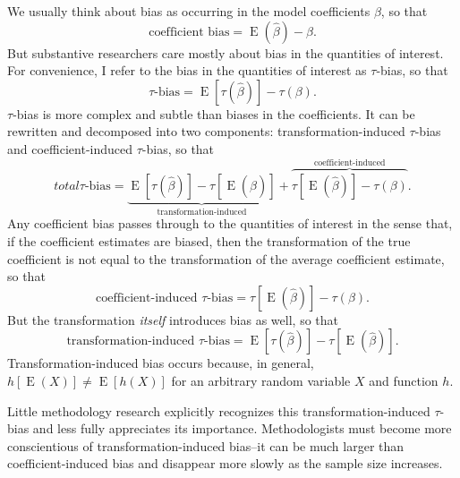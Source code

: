 \documentclass[12pt]{article}
\DeclareMathOperator*{\E}{\text{E}}
\begin{document}
We usually think about bias as occurring in the model coefficients $\beta$, so that 
\begin{equation}
\text{coefficient bias} = \E(\hat{\beta}) - \beta \text{.}  \nonumber
\end{equation}
But substantive researchers care mostly about bias in the quantities of interest. For convenience, I refer to the bias in the quantities of interest as $\tau$-bias, so that
\begin{equation}
\tau\text{-bias} = \E[\tau(\hat{\beta})] - \tau(\beta)\text{.} \nonumber
\end{equation}
$\tau$-bias is more complex and subtle than biases in the coefficients. 
It can be rewritten and decomposed into two components: transformation-induced $\tau$-bias and coefficient-induced $\tau$-bias, so that
\begin{equation}
total \tau\text{-bias}= \underbrace{ \E[\tau(\hat{\beta})]-  \tau[\E(\hat{\beta})]  }_{\text{transformation-induced}} + \overbrace{  \tau[\E(\hat{\beta})] - \tau(\beta)  }^{\text{coefficient-induced}}\text{.} \nonumber
\end{equation}
Any coefficient bias passes through to the quantities of interest in the sense that, if the coefficient estimates are biased, then the transformation of the true coefficient is not equal to the transformation of the average coefficient estimate, so that
\begin{equation}
\text{coefficient-induced } \tau\text{-bias} = \tau[\E(\hat{\beta})] - \tau(\beta) \text{.}\nonumber
\end{equation}
But the transformation \textit{itself} introduces bias as well, so that
\begin{equation}
\text{transformation-induced } \tau\text{-bias} = \E[\tau(\hat{\beta})]-  \tau[\E(\hat{\beta})] \text{.}\nonumber
\end{equation}
Transformation-induced bias occurs because, in general, $h[\E(X)] \neq \E[h(X)]$ for an arbitrary random variable $X$ and function $h$.

Little methodology research explicitly recognizes this transformation-induced $\tau$-bias and less fully appreciates its importance. 
Methodologists must become more conscientious of transformation-induced bias--it can be much larger than coefficient-induced bias and disappear more slowly as the sample size increases.

\end{document}
